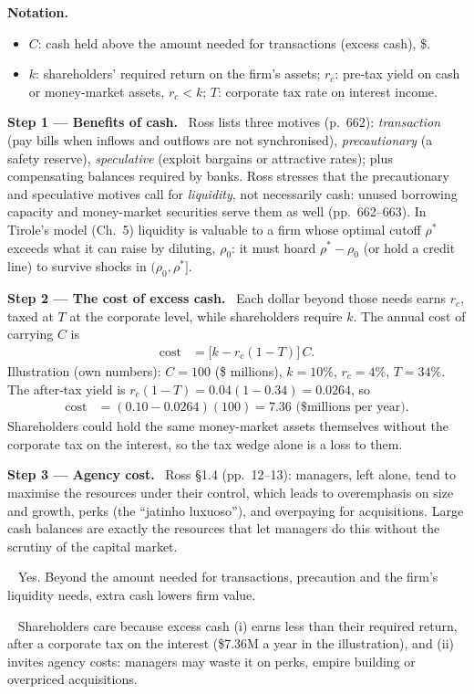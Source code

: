 \documentclass[11pt,a4paper]{article}
\newcommand{\notation}{\par\noindent\textbf{Notation.}}
\newcommand{\step}[2]{\par\medskip\noindent\textbf{Step #1 --- #2.}~}
\newcommand{\answer}[1]{\par\smallskip\noindent\fbox{\textbf{Answer #1.}}~}
\begin{document}
\notation
\begin{itemize}
  \item $C$: cash held above the amount needed for transactions (excess cash), \$.
  \item $k$: shareholders' required return on the firm's assets; $r_c$: pre-tax yield on cash or money-market assets, $r_c<k$; $T$: corporate tax rate on interest income.
\end{itemize}

\step{1}{Benefits of cash} Ross lists three motives (p.~662): \emph{transaction} (pay bills when inflows and outflows are not synchronised), \emph{precautionary} (a safety reserve), \emph{speculative} (exploit bargains or attractive rates); plus compensating balances required by banks. Ross stresses that the precautionary and speculative motives call for \emph{liquidity}, not necessarily cash: unused borrowing capacity and money-market securities serve them as well (pp.~662--663). In Tirole's model (Ch.~5) liquidity is valuable to a firm whose optimal cutoff $\rho^*$ exceeds what it can raise by diluting, $\rho_0$: it must hoard $\rho^*-\rho_0$ (or hold a credit line) to survive shocks in $(\rho_0,\rho^*]$.

\step{2}{The cost of excess cash} Each dollar beyond those needs earns $r_c$, taxed at $T$ at the corporate level, while shareholders require $k$. The annual cost of carrying $C$ is
\begin{align}
  \text{cost} &= \big[k - r_c(1-T)\big]\,C. \label{r6e1-cost}
\end{align}
Illustration (own numbers): $C=100$ (\$ millions), $k=10\%$, $r_c=4\%$, $T=34\%$. The after-tax yield is $r_c(1-T)=0.04(1-0.34)=0.0264$, so
\begin{align}
  \text{cost} &= (0.10-0.0264)(100) = 7.36 \text{ (\$ millions per year)}. \nonumber
\end{align}
Shareholders could hold the same money-market assets themselves without the corporate tax on the interest, so the tax wedge alone is a loss to them.

\step{3}{Agency cost} Ross \S 1.4 (pp.~12--13): managers, left alone, tend to maximise the resources under their control, which leads to overemphasis on size and growth, perks (the ``jatinho luxuoso''), and overpaying for acquisitions. Large cash balances are exactly the resources that let managers do this without the scrutiny of the capital market.

\answer{(a)} Yes. Beyond the amount needed for transactions, precaution and the firm's liquidity needs, extra cash lowers firm value.
\answer{(b)} Shareholders care because excess cash (i) earns less than their required return, after a corporate tax on the interest (\$7.36M a year in the illustration), and (ii) invites agency costs: managers may waste it on perks, empire building or overpriced acquisitions.
\end{document}
